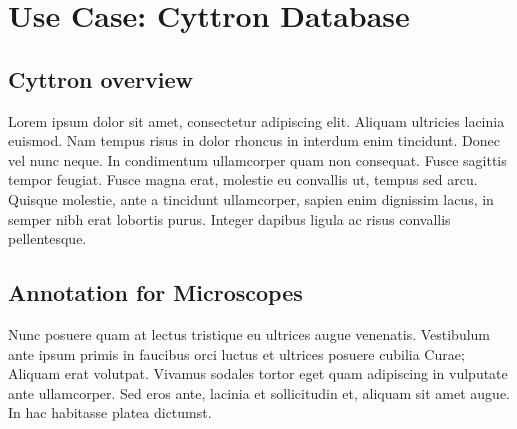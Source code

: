
\chapter{Use Case: Cyttron Database} %

\label{Chapter4} %



\section{Cyttron overview}

Lorem ipsum dolor sit amet, consectetur adipiscing elit. Aliquam
ultricies lacinia euismod. Nam tempus risus in dolor rhoncus in
interdum enim tincidunt. Donec vel nunc neque. In condimentum
ullamcorper quam non consequat. Fusce sagittis tempor feugiat. Fusce
magna erat, molestie eu convallis ut, tempus sed arcu. Quisque
molestie, ante a tincidunt ullamcorper, sapien enim dignissim lacus,
in semper nibh erat lobortis purus. Integer dapibus ligula ac risus
convallis pellentesque.


\section{Annotation for Microscopes}

Nunc posuere quam at lectus tristique eu ultrices augue
venenatis. Vestibulum ante ipsum primis in faucibus orci luctus et
ultrices posuere cubilia Curae; Aliquam erat volutpat. Vivamus sodales
tortor eget quam adipiscing in vulputate ante ullamcorper. Sed eros
ante, lacinia et sollicitudin et, aliquam sit amet augue. In hac
habitasse platea dictumst.


